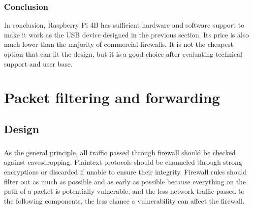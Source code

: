 \documentclass[mscthesis]{usiinfthesis}
\begin{document}
\subsection{Conclusion}
In conclusion, Raspberry Pi 4B has sufficient hardware and software support to make it work as the USB device designed in the previous section. Its price is also much lower than the majority of commercial firewalls. It is not the cheapest option that can fit the design, but it is a good choice after evaluating technical support and user base.

\chapter{Packet filtering and forwarding}
\section{Design}
\paragraph{}
As the general principle, all traffic passed through firewall should be checked against eavesdropping. Plaintext protocols should be channeled through strong encryptions or discarded if unable to ensure their integrity. Firewall rules should filter out as much as possible and as early as possible because everything on the path of a packet is potentially vulnerable, and the less network traffic passed to the following components, the less chance a vulnerability can affect the firewall.
\end{document}
